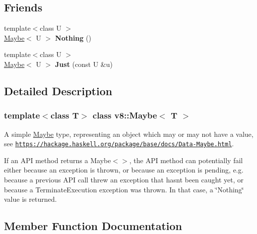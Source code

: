 \subsection*{Friends}
\begin{DoxyCompactItemize}
\item 
\mbox{\label{classv8_1_1Maybe_aeb9593e125b42d748acbd69b72c89f37}} 
{\footnotesize template$<$class U $>$ }\\\mbox{\hyperlink{classv8_1_1Maybe}{Maybe}}$<$ U $>$ {\bfseries Nothing} ()
\item 
\mbox{\label{classv8_1_1Maybe_aeff0e7fedd63cfebe9a5286e2cd8552d}} 
{\footnotesize template$<$class U $>$ }\\\mbox{\hyperlink{classv8_1_1Maybe}{Maybe}}$<$ U $>$ {\bfseries Just} (const U \&u)
\end{DoxyCompactItemize}


\subsection{Detailed Description}
\subsubsection*{template$<$class T$>$\newline
class v8\+::\+Maybe$<$ T $>$}

A simple \mbox{\hyperlink{classv8_1_1Maybe}{Maybe}} type, representing an object which may or may not have a value, see \href{https://hackage.haskell.org/package/base/docs/Data-Maybe.html}{\tt https\+://hackage.\+haskell.\+org/package/base/docs/\+Data-\/\+Maybe.\+html}.

If an A\+PI method returns a Maybe$<$$>$, the A\+PI method can potentially fail either because an exception is thrown, or because an exception is pending, e.\+g. because a previous A\+PI call threw an exception that hasn\textquotesingle{}t been caught yet, or because a Terminate\+Execution exception was thrown. In that case, a \char`\"{}\+Nothing\char`\"{} value is returned. 

\subsection{Member Function Documentation}
\mbox{\label{classv8_1_1Maybe_a6c35f4870a5b5049d09ba5f13c67ede9}} 
